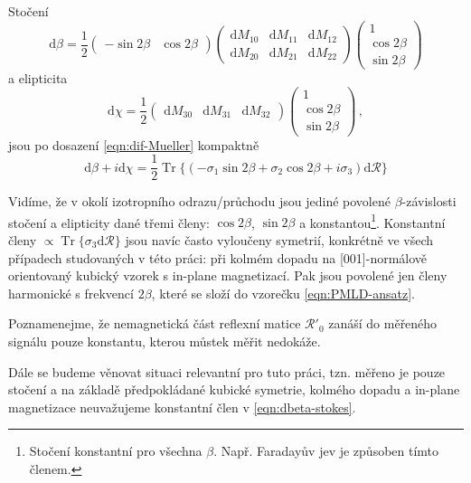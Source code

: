 Stočení
\begin{equation}
    \textrm{d}\beta = \frac{1}{2}\begin{pmatrix} -\sin2\beta&\cos2\beta \end{pmatrix} \begin{pmatrix} \textrm{d}M_{10}&\textrm{d}M_{11}&\textrm{d}M_{12}\\\textrm{d}M_{20}&\textrm{d}M_{21}&\textrm{d}M_{22} \end{pmatrix} \begin{pmatrix} 1\\\cos2\beta\\\sin2\beta \end{pmatrix}
\end{equation}
a elipticita
\begin{equation}
    \textrm{d}\chi = \frac{1}{2}\begin{pmatrix} \textrm{d}M_{30}&\textrm{d}M_{31}&\textrm{d}M_{32} \end{pmatrix} \begin{pmatrix} 1\\\cos2\beta\\\sin2\beta \end{pmatrix} \,,
\end{equation}
jsou po dosazení \eqref{eqn:dif-Mueller} kompaktně
\begin{equation}
    \label{eqn:dbeta-stokes}
    \textrm{d}\beta + i \textrm{d}\chi = \frac{1}{2} \operatorname{Tr} \lbrace \left( -\sigma_1\sin2\beta+\sigma_2\cos2\beta+i\sigma_3   \right) \textrm{d}\mathcal{R} \rbrace
\end{equation}

Vidíme, že v okolí izotropního odrazu/průchodu jsou jediné povolené $\beta$-závislosti stočení a elipticity dané třemi členy: $\cos2\beta$, $\sin2\beta$ a konstantou\footnote{Stočení konstantní pro všechna $\beta$. Např. Faradayův jev je způsoben tímto členem.}.
Konstantní členy $\propto \operatorname{Tr}\lbrace \sigma_3 \textrm{d}\mathcal{R} \rbrace$ jsou navíc často vyloučeny symetrií, konkrétně ve všech případech studovaných v této práci: při kolmém dopadu na [001]-normálově orientovaný kubický vzorek s in-plane magnetizací.
Pak jsou povolené jen členy harmonické s frekvencí $2\beta$, které se složí do vzorečku \eqref{eqn:PMLD-ansatz}.

Poznamenejme, že nemagnetická část reflexní matice $\mathcal{R}'_0$ zanáší do měřeného signálu pouze konstantu, kterou můstek měřit nedokáže.

Dále se budeme věnovat situaci relevantní pro tuto práci, tzn. měřeno je pouze stočení a na základě předpokládané kubické symetrie, kolmého dopadu a in-plane magnetizace neuvažujeme konstantní člen v \eqref{eqn:dbeta-stokes}.

